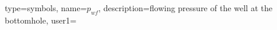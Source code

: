 {
  type=symbols,
  name={\ensuremath{p_{wf}}},
  description={flowing pressure of the well at the bottomhole},
  user1=\unexpanded{\si{\pascal}}
}





% 
% 
% 
